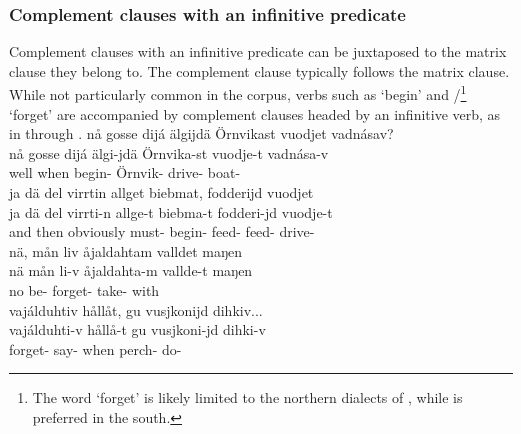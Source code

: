 \subsubsection{Complement clauses with an infinitive predicate}\label{infinitiveComplementClauses}
Complement clauses with an infinitive predicate can be juxtaposed to the matrix clause they belong to. The complement clause typically follows the matrix clause. 
While not particularly common in the corpus, verbs such as  ‘begin’ and /\footnote{The word  ‘forget’ is likely limited to the northern dialects of \PS, while  is preferred in the south.} 
‘forget’ %
are accompanied by complement clauses headed by an infinitive verb, as in  through .
\ea\label{complClauseJuxInf1}
\glll	nå gosse dijá älgijdä Örnvikast vuodjet vadnásav?\\
	nå gosse dijá älgi-jdä Örnvika-st vuodje-t vadnása-v\\
	well when  begin- Örnvik- drive- boat-\\\nopagebreak
{} 
\z
\ea\label{complClauseJuxInf2}
\glll	ja dä del virrtin allget biebmat, fodderijd vuodjet\\
	ja dä del virrti-n allge-t biebma-t fodderi-jd vuodje-t\\
	and then obviously must- begin- feed- feed- drive-\\\nopagebreak
{} 
\z
\ea\label{complClauseJuxInf3}%
\glll	nä, mån liv åjaldahtam valldet maŋen\\
	nä mån li-v åjaldahta-m vallde-t maŋen\\
	no  be- forget- take- with\\\nopagebreak
{} 
\z
\ea\label{complClauseJuxInf4}%
\glll	vajálduhtiv hållåt, gu vusjkonijd dihkiv...\\
	vajálduhti-v hållå-t gu vusjkoni-jd dihki-v\\
	forget- say- when perch- do-\\\nopagebreak
{} 
\z
{}


